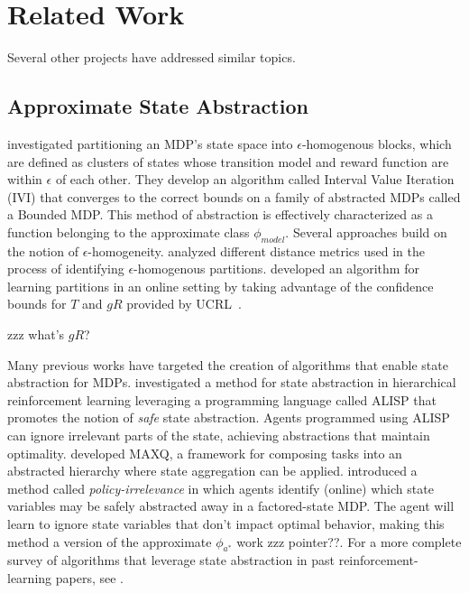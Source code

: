 \section{Related Work}

Several other projects have addressed similar topics.

\subsection{Approximate State Abstraction}
 investigated partitioning an \ac{MDP}'s state space into $\epsilon$-homogenous blocks, which are defined as clusters of states whose transition model and reward function are within $\epsilon$ of each other. They develop an algorithm called Interval Value Iteration (IVI) that converges to the correct bounds on a family of abstracted MDPs called a Bounded MDP. This method of abstraction is effectively characterized as a function belonging to the approximate class $\phi_{model}$.
Several approaches build on the notion of $\epsilon$-homogeneity.  analyzed different distance metrics used in the process of identifying $\epsilon$-homogenous partitions.  developed an algorithm for learning partitions in an online setting by taking advantage of the confidence bounds for $T$ and $gR$ provided by UCRL~\cite{auer2009near}.

zzz what's $gR$?

Many previous works have targeted the creation of algorithms that enable state abstraction for MDPs.  investigated a method for state abstraction in hierarchical reinforcement learning leveraging a programming language called ALISP that promotes the notion of {\it safe} state abstraction. Agents programmed using ALISP can ignore irrelevant parts of the state, achieving abstractions that maintain optimality.  developed MAXQ, a framework for composing tasks into an abstracted hierarchy where state aggregation can be applied.  introduced a method called {\it policy-irrelevance} in which agents identify (online) which state variables may be safely abstracted away in a factored-state \ac{MDP}. The agent will learn to ignore state variables that don't impact optimal behavior, making this method a version of the approximate $\phi_{a^*}$ work zzz pointer??. For a more complete survey of algorithms that leverage state abstraction in past reinforcement-learning papers, see .

